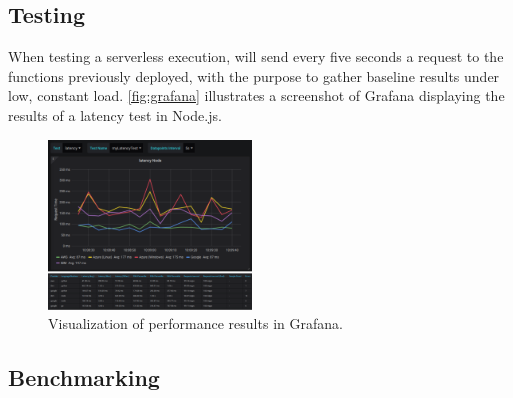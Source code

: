\subsection{Testing}

When testing a serverless execution, \sys will send every five seconds a request to the functions previously deployed, with the purpose to gather baseline results under low, constant load. %
\autoref{fig:grafana} illustrates a screenshot of Grafana displaying the results of a latency test in Node.js. 

\begin{figure}[!t]
\begin{center}
\includegraphics[width=0.48\textwidth]{bilder/grafana_combined.pdf}
\caption{Visualization of performance results in Grafana.}
\label{fig:grafana}
\end{center}
\end{figure}




\subsection{Benchmarking}

